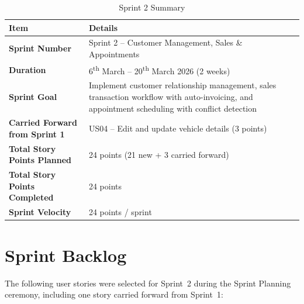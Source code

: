 \documentclass[12pt,a4paper]{article}
\newcommand{\thead}[1]{\textbf{\color{white}#1}}
\begin{document}
\begin{table}[H]
\centering
\renewcommand{\arraystretch}{1.4}
\begin{tabularx}{\textwidth}{|l|Y|}
\hline
{} \thead{Item} & \thead{Details} \\
\hline
\textbf{Sprint Number}    & Sprint 2 -- Customer Management, Sales \& Appointments \\
\hline
{}
\textbf{Duration}          & 6\textsuperscript{th} March -- 20\textsuperscript{th} March 2026 (2 weeks) \\
\hline
\textbf{Sprint Goal}       & Implement customer relationship management, sales transaction workflow with auto-invoicing, and appointment scheduling with conflict detection \\
\hline
{}
\textbf{Carried Forward from Sprint 1} & US04 -- Edit and update vehicle details (3 points) \\
\hline
{}
\textbf{Total Story Points Planned} & 24 points (21 new + 3 carried forward) \\
\hline
\textbf{Total Story Points Completed} & 24 points \\
\hline
{}
\textbf{Sprint Velocity}   & 24 points / sprint \\
\hline
\end{tabularx}
\caption{Sprint 2 Summary}
\end{table}

\section{Sprint Backlog}

The following user stories were selected for Sprint~2 during the Sprint Planning ceremony, including one story carried forward from Sprint~1:
\end{document}
